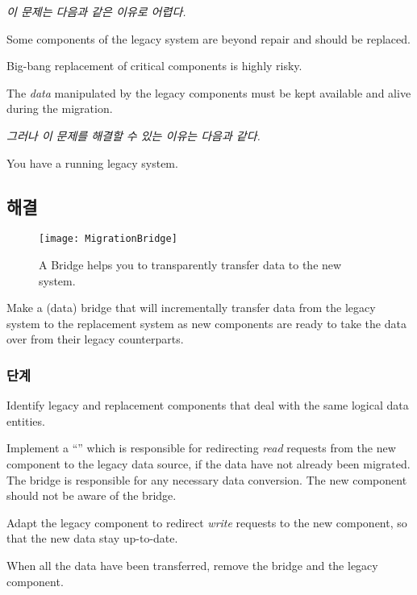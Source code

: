\documentclass[a4paper,10pt,twoside]{book}
\begin{document}
\emph{이 문제는 다음과 같은 이유로 어렵다.}

\begin{bulletlist}
\item Some components of the legacy system are beyond repair and should be replaced.

\item Big-bang replacement of critical components is highly risky.

\item The \emph{data} manipulated by the legacy components must be kept available and alive during the migration.
\end{bulletlist}

\emph{그러나 이 문제를 해결할 수 있는 이유는 다음과 같다.}

\begin{bulletlist}
\item You have a running legacy system.
\end{bulletlist}

\subsection*{해결}

\begin{figure}
\begin{center}
\texttt{[image: MigrationBridge]}
\caption{A Bridge helps you to transparently transfer data to the new system.}
\end{center}
\end{figure}

Make a (data) bridge that will incrementally transfer data from the legacy system to the replacement system as new components are ready to take the data over from their legacy counterparts.

\subsubsection*{단계}

\begin{bulletlist}
\item Identify legacy and replacement components that deal with the same logical data entities.

\item Implement a ``'' which is responsible for redirecting \emph{read} requests from the new component to the legacy data source, if the data have not already been migrated. The bridge is responsible for any necessary data conversion. The new component should not be aware of the bridge.

\item Adapt the legacy component to redirect \emph{write} requests to the new component, so that the new data stay up-to-date.

\item When all the data have been transferred, remove the bridge and the legacy component.
\end{bulletlist}
\end{document}
